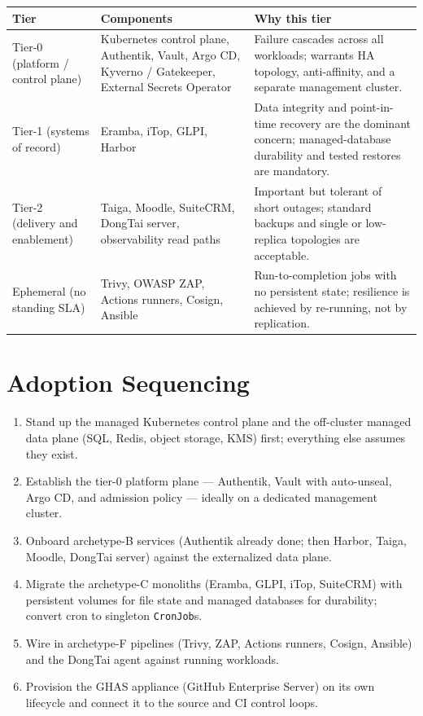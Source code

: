 \documentclass[10pt,letterpaper]{article}
\begin{document}
\begin{tabularx}{\textwidth}{L{1.5in} L{2.0in} Y}
\toprule
\textbf{Tier} & \textbf{Components} & \textbf{Why this tier} \\
\midrule
Tier-0 (platform / control plane) & Kubernetes control plane, Authentik, Vault, Argo CD, Kyverno / Gatekeeper, External Secrets Operator & Failure cascades across all workloads; warrants HA topology, anti-affinity, and a separate management cluster. \\
Tier-1 (systems of record) & Eramba, iTop, GLPI, Harbor & Data integrity and point-in-time recovery are the dominant concern; managed-database durability and tested restores are mandatory. \\
Tier-2 (delivery and enablement) & Taiga, Moodle, SuiteCRM, DongTai server, observability read paths & Important but tolerant of short outages; standard backups and single or low-replica topologies are acceptable. \\
Ephemeral (no standing SLA) & Trivy, OWASP ZAP, Actions runners, Cosign, Ansible & Run-to-completion jobs with no persistent state; resilience is achieved by re-running, not by replication. \\
\bottomrule
\end{tabularx}

\section{Adoption Sequencing}

\begin{enumerate}
  \item Stand up the managed Kubernetes control plane and the off-cluster managed data plane (SQL, Redis, object storage, KMS) first; everything else assumes they exist.
  \item Establish the tier-0 platform plane --- Authentik, Vault with auto-unseal, Argo CD, and admission policy --- ideally on a dedicated management cluster.
  \item Onboard archetype-B services (Authentik already done; then Harbor, Taiga, Moodle, DongTai server) against the externalized data plane.
  \item Migrate the archetype-C monoliths (Eramba, GLPI, iTop, SuiteCRM) with persistent volumes for file state and managed databases for durability; convert cron to singleton \texttt{CronJob}s.
  \item Wire in archetype-F pipelines (Trivy, ZAP, Actions runners, Cosign, Ansible) and the DongTai agent against running workloads.
  \item Provision the GHAS appliance (GitHub Enterprise Server) on its own lifecycle and connect it to the source and CI control loops.
\end{enumerate}
\end{document}
